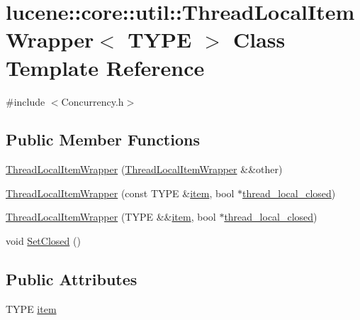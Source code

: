 \hypertarget{classlucene_1_1core_1_1util_1_1ThreadLocalItemWrapper}{}\section{lucene\+:\+:core\+:\+:util\+:\+:Thread\+Local\+Item\+Wrapper$<$ T\+Y\+PE $>$ Class Template Reference}
\label{classlucene_1_1core_1_1util_1_1ThreadLocalItemWrapper}


{\ttfamily \#include $<$Concurrency.\+h$>$}

\subsection*{Public Member Functions}
\begin{DoxyCompactItemize}
\item 
\mbox{\hyperlink{classlucene_1_1core_1_1util_1_1ThreadLocalItemWrapper_a22b175e5fd85c3d212bcf35962854add}{Thread\+Local\+Item\+Wrapper}} (\mbox{\hyperlink{classlucene_1_1core_1_1util_1_1ThreadLocalItemWrapper}{Thread\+Local\+Item\+Wrapper}} \&\&other)
\item 
\mbox{\hyperlink{classlucene_1_1core_1_1util_1_1ThreadLocalItemWrapper_aeb556f148918331e663767bf7522d9b6}{Thread\+Local\+Item\+Wrapper}} (const T\+Y\+PE \&\mbox{\hyperlink{classlucene_1_1core_1_1util_1_1ThreadLocalItemWrapper_ac4814c461c9635ddb4f535f95e0d6cb8}{item}}, bool $\ast$\mbox{\hyperlink{classlucene_1_1core_1_1util_1_1ThreadLocalItemWrapper_a5e0fecb4397f3d5e19a03d07adde08b6}{thread\+\_\+local\+\_\+closed}})
\item 
\mbox{\hyperlink{classlucene_1_1core_1_1util_1_1ThreadLocalItemWrapper_af5f7a927aa01a94971cb9a358488d551}{Thread\+Local\+Item\+Wrapper}} (T\+Y\+PE \&\&\mbox{\hyperlink{classlucene_1_1core_1_1util_1_1ThreadLocalItemWrapper_ac4814c461c9635ddb4f535f95e0d6cb8}{item}}, bool $\ast$\mbox{\hyperlink{classlucene_1_1core_1_1util_1_1ThreadLocalItemWrapper_a5e0fecb4397f3d5e19a03d07adde08b6}{thread\+\_\+local\+\_\+closed}})
\item 
void \mbox{\hyperlink{classlucene_1_1core_1_1util_1_1ThreadLocalItemWrapper_a7ef4309330e9ca0eb7c0b99f19ff1948}{Set\+Closed}} ()
\end{DoxyCompactItemize}
\subsection*{Public Attributes}
\begin{DoxyCompactItemize}
\item 
T\+Y\+PE \mbox{\hyperlink{classlucene_1_1core_1_1util_1_1ThreadLocalItemWrapper_ac4814c461c9635ddb4f535f95e0d6cb8}{item}}
\end{DoxyCompactItemize}
